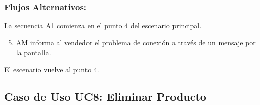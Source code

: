 \begin{framed}
\subsubsection{Flujos Alternativos: }

La secuencia A1 comienza en el punto 4 del escenario principal.
\begin{enumerate}
    \setcounter{enumi}{4}
    \item AM informa al vendedor el problema de conexión a través de un mensaje por la pantalla.
\end{enumerate}
El escenario vuelve al punto 4.

\end{framed}


\subsection{Caso de Uso UC8: Eliminar Producto}

